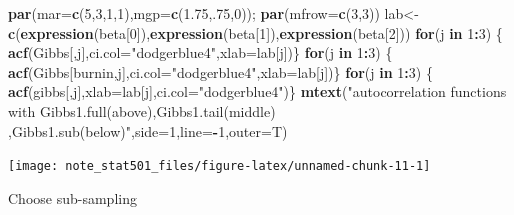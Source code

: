 \documentclass[
]{article}
\newenvironment{Shaded}{\begin{snugshade}}{\end{snugshade}}
\newcommand{\ControlFlowTok}[1]{\textcolor[rgb]{0.13,0.29,0.53}{\textbf{#1}}}
\newcommand{\DataTypeTok}[1]{\textcolor[rgb]{0.13,0.29,0.53}{#1}}
\newcommand{\DecValTok}[1]{\textcolor[rgb]{0.00,0.00,0.81}{#1}}
\newcommand{\FloatTok}[1]{\textcolor[rgb]{0.00,0.00,0.81}{#1}}
\newcommand{\KeywordTok}[1]{\textcolor[rgb]{0.13,0.29,0.53}{\textbf{#1}}}
\newcommand{\NormalTok}[1]{#1}
\newcommand{\OperatorTok}[1]{\textcolor[rgb]{0.81,0.36,0.00}{\textbf{#1}}}
\newcommand{\StringTok}[1]{\textcolor[rgb]{0.31,0.60,0.02}{#1}}
\begin{document}
\begin{Shaded}
\begin{Highlighting}[]
\KeywordTok{par}\NormalTok{(}\DataTypeTok{mar=}\KeywordTok{c}\NormalTok{(}\DecValTok{5}\NormalTok{,}\DecValTok{3}\NormalTok{,}\DecValTok{1}\NormalTok{,}\DecValTok{1}\NormalTok{),}\DataTypeTok{mgp=}\KeywordTok{c}\NormalTok{(}\FloatTok{1.75}\NormalTok{,.}\DecValTok{75}\NormalTok{,}\DecValTok{0}\NormalTok{)); }\KeywordTok{par}\NormalTok{(}\DataTypeTok{mfrow=}\KeywordTok{c}\NormalTok{(}\DecValTok{3}\NormalTok{,}\DecValTok{3}\NormalTok{))}
\NormalTok{lab<-}\KeywordTok{c}\NormalTok{(}\KeywordTok{expression}\NormalTok{(beta[}\DecValTok{0}\NormalTok{]),}\KeywordTok{expression}\NormalTok{(beta[}\DecValTok{1}\NormalTok{]),}\KeywordTok{expression}\NormalTok{(beta[}\DecValTok{2}\NormalTok{]))}
\ControlFlowTok{for}\NormalTok{(j }\ControlFlowTok{in} \DecValTok{1}\OperatorTok{:}\DecValTok{3}\NormalTok{) \{}
\KeywordTok{acf}\NormalTok{(Gibbs[,j],}\DataTypeTok{ci.col=}\StringTok{"dodgerblue4"}\NormalTok{,}\DataTypeTok{xlab=}\NormalTok{lab[j])\}  }
\ControlFlowTok{for}\NormalTok{(j }\ControlFlowTok{in} \DecValTok{1}\OperatorTok{:}\DecValTok{3}\NormalTok{) \{}
\KeywordTok{acf}\NormalTok{(Gibbs[burnin,j],}\DataTypeTok{ci.col=}\StringTok{"dodgerblue4"}\NormalTok{,}\DataTypeTok{xlab=}\NormalTok{lab[j])\} }
\ControlFlowTok{for}\NormalTok{(j }\ControlFlowTok{in} \DecValTok{1}\OperatorTok{:}\DecValTok{3}\NormalTok{) \{}
\KeywordTok{acf}\NormalTok{(gibbs[,j],}\DataTypeTok{xlab=}\NormalTok{lab[j],}\DataTypeTok{ci.col=}\StringTok{"dodgerblue4"}\NormalTok{)\}}
\KeywordTok{mtext}\NormalTok{(}\StringTok{"autocorrelation functions with Gibbs1.full(above),Gibbs1.tail(middle) ,Gibbs1.sub(below)"}\NormalTok{,}\DataTypeTok{side=}\DecValTok{1}\NormalTok{,}\DataTypeTok{line=}\OperatorTok{-}\DecValTok{1}\NormalTok{,}\DataTypeTok{outer=}\NormalTok{T)}
\end{Highlighting}
\end{Shaded}

\begin{center}\texttt{[image: note\_stat501\_files/figure-latex/unnamed-chunk-11-1]} \end{center}

Choose sub-sampling
\end{document}
